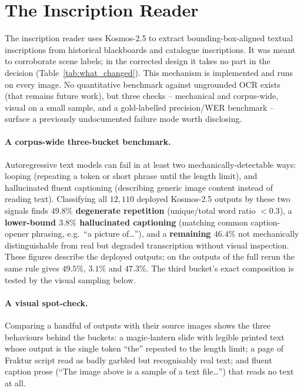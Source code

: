 \documentclass[12pt,a4paper]{report}
\begin{document}
\section{The Inscription Reader}
\label{sec:agent5_ocr}
The inscription reader uses Kosmos-2.5 to extract bounding-box-aligned textual inscriptions from historical blackboards and catalogue inscriptions. It was meant to corroborate scene labels; in the corrected design it takes no part in the decision (Table~\ref{tab:what_changed}). This mechanism is implemented and runs on every image. No quantitative benchmark against ungrounded OCR exists (that remains future work), but three checks -- mechanical and corpus-wide, visual on a small sample, and a gold-labelled precision/WER benchmark -- surface a previously undocumented failure mode worth disclosing.

\paragraph{A corpus-wide three-bucket benchmark.} Autoregressive text models can fail in at least two mechanically-detectable ways: looping (repeating a token or short phrase until the length limit), and hallucinated fluent captioning (describing generic image content instead of reading text). Classifying all $12{,}110$ deployed Kosmos-2.5 outputs by these two signals finds \textbf{$49.8\%$ degenerate repetition} (unique/total word ratio $<0.3$), a \textbf{lower-bound $3.8\%$ hallucinated captioning} (matching common caption-opener phrasing, e.g.\ ``a picture of\ldots''), and a \textbf{remaining $46.4\%$} not mechanically distinguishable from real but degraded transcription without visual inspection. These figures describe the deployed outputs; on the outputs of the full rerun the same rule gives $49.5\%$, $3.1\%$ and $47.3\%$. The third bucket's exact composition is tested by the visual sampling below.

\paragraph{A visual spot-check.} Comparing a handful of outputs with their source images shows the three behaviours behind the buckets: a magic-lantern slide with legible printed text whose output is the single token ``the'' repeated to the length limit; a page of Fraktur script read as badly garbled but recognisably real text; and fluent caption prose (``The image above is a sample of a text file\ldots'') that reads no text at all.
\end{document}
